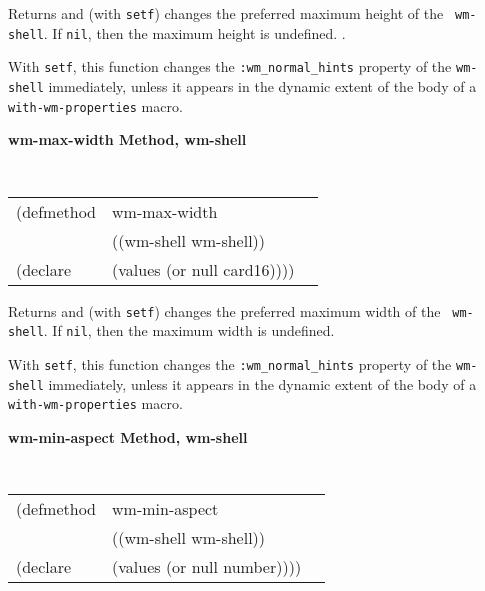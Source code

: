 \begin{flushright} \parbox[t]{6.125in}{
Returns and (with {\tt setf}) changes the preferred maximum height of the {\tt
wm-shell}. If {\tt nil}, then the maximum height is undefined. .

With {\tt setf}, this function changes the {\tt :wm\_normal\_hints} property of
the {\tt wm-shell} immediately, unless it appears in the dynamic extent of the
body of a {\tt with-wm-properties} macro.

}\end{flushright}

{\samepage
{\large {\bf wm-max-width \hfill Method, wm-shell}}
\begin{flushright} \parbox[t]{6.125in}{
\tt
\begin{tabular}{lll}
\raggedright
(defmethod & wm-max-width & \\
           & ((wm-shell  wm-shell)) \\
(declare   & (values (or null card16))))
\end{tabular}
\rm

}\end{flushright}}

\begin{flushright} \parbox[t]{6.125in}{
Returns and (with {\tt setf}) changes the preferred maximum width of the {\tt
wm-shell}. If {\tt nil}, then the maximum width is undefined. 

With {\tt setf}, this function changes the {\tt :wm\_normal\_hints} property of
the {\tt wm-shell} immediately, unless it appears in the dynamic extent of the
body of a {\tt with-wm-properties} macro.

}\end{flushright}




{\samepage
{\large {\bf wm-min-aspect \hfill Method, wm-shell}}
\begin{flushright} \parbox[t]{6.125in}{
\tt
\begin{tabular}{lll}
\raggedright
(defmethod & wm-min-aspect & \\
           & ((wm-shell  wm-shell)) \\
(declare   & (values (or null number))))
\end{tabular}
\rm

}\end{flushright}}

